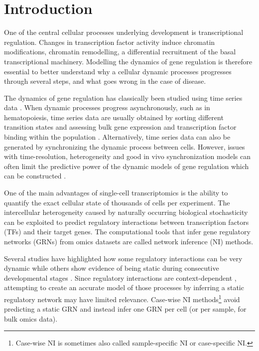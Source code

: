 
\section{Introduction}

One of the central cellular processes underlying development is transcriptional regulation. 
Changes in transcription factor activity induce chromatin modifications, 
chromatin remodelling, a differential recruitment of the basal transcriptional machinery\cite{coulon_eukaryotictranscriptionaldynamics_2013}.
Modelling the dynamics of gene regulation is therefore essential to better understand
why a cellular dynamic processes progresses through several steps,
and what goes wrong in the case of disease.

The dynamics of gene regulation has classically been studied using time series data \cite{bar-joseph_studyingmodellingdynamic_2012}. When dynamic processes progress asynchronously, such as in hematopoiesis, time series data are usually obtained by sorting different transition states and assessing bulk gene expression and transcription factor binding within the population \cite{novershtern_denselyinterconnectedtranscriptional_2011, may_dynamicanalysisgene_2013, jojic_identificationtranscriptionalregulators_2013, goode_dynamicgeneregulatory_2016}. Alternatively, time series data can also be generated by synchronizing the dynamic process between cells. However, issues with time-resolution, heterogeneity and good in vivo synchronization models can often limit the predictive power of the dynamic models of gene regulation which can be constructed \cite{bar-joseph_studyingmodellingdynamic_2012}.

One of the main advantages of single-cell transcriptomics is the ability to quantify the exact cellular state of thousands of cells per experiment. The intercellular heterogeneity caused by naturally occurring biological stochasticity \cite{padovan-merhar_usingvariabilitygene_2013} can be exploited to predict regulatory interactions between transcription factors (TFs) and their target genes. The computational tools that infer gene regulatory networks (GRNs) from omics datasets are called network inference (NI) methods.

Several studies have highlighted how some regulatory interactions can be very dynamic while others show evidence of being static during consecutive developmental stages \cite{moignard_characterizationtranscriptionalnetworks_2013, pina_singlecellnetworkanalysis_2015}. 
Since regulatory interactions are context-dependent \cite{papp_genomewideanalysiscontextdependence_2005}, attempting to create an accurate model of those processes by inferring a static regulatory network may have limited relevance.
Case-wise NI methods\footnote{Case-wise NI is sometimes also called sample-specific NI or case-specific NI.} avoid predicting a static GRN and instead infer one GRN per cell (or per sample, for bulk omics data).

